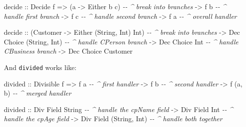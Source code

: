 \documentclass[]{article}
\newenvironment{Shaded}{}{}
\newcommand{\CommentTok}[1]{\textcolor[rgb]{0.38,0.63,0.69}{\textit{#1}}}
\newcommand{\DataTypeTok}[1]{\textcolor[rgb]{0.56,0.13,0.00}{#1}}
\newcommand{\NormalTok}[1]{#1}
\newcommand{\OtherTok}[1]{\textcolor[rgb]{0.00,0.44,0.13}{#1}}
\begin{document}
\begin{Shaded}
\begin{Highlighting}[]
\NormalTok{decide}
\OtherTok{    ::} \DataTypeTok{Decide}\NormalTok{ f}
    \OtherTok{=>}\NormalTok{ (a }\OtherTok{{-}>} \DataTypeTok{Either}\NormalTok{ b c)    }\CommentTok{{-}{-} \^{} break into branches}
    \OtherTok{{-}>}\NormalTok{ f b                  }\CommentTok{{-}{-} \^{} handle first branch}
    \OtherTok{{-}>}\NormalTok{ f c                  }\CommentTok{{-}{-} \^{} handle second branch}
    \OtherTok{{-}>}\NormalTok{ f a                  }\CommentTok{{-}{-} \^{} overall handler}

\NormalTok{decide}
\OtherTok{    ::}\NormalTok{ (}\DataTypeTok{Customer} \OtherTok{{-}>} \DataTypeTok{Either}\NormalTok{ (}\DataTypeTok{String}\NormalTok{, }\DataTypeTok{Int}\NormalTok{) }\DataTypeTok{Int}\NormalTok{)   }\CommentTok{{-}{-} \^{} break into branches}
    \OtherTok{{-}>} \DataTypeTok{Dec} \DataTypeTok{Choice}\NormalTok{ (}\DataTypeTok{String}\NormalTok{, }\DataTypeTok{Int}\NormalTok{)                 }\CommentTok{{-}{-} \^{} handle CPerson branch}
    \OtherTok{{-}>} \DataTypeTok{Dec} \DataTypeTok{Choice} \DataTypeTok{Int}                           \CommentTok{{-}{-} \^{} handle CBusiness branch}
    \OtherTok{{-}>} \DataTypeTok{Dec} \DataTypeTok{Choice} \DataTypeTok{Customer}
\end{Highlighting}
\end{Shaded}

And \texttt{divided} works like:

\begin{Shaded}
\begin{Highlighting}[]
\NormalTok{divided}
\OtherTok{    ::} \DataTypeTok{Divisible}\NormalTok{ f}
    \OtherTok{=>}\NormalTok{ f a          }\CommentTok{{-}{-} \^{} first handler}
    \OtherTok{{-}>}\NormalTok{ f b          }\CommentTok{{-}{-} \^{} second handler}
    \OtherTok{{-}>}\NormalTok{ f (a, b)     }\CommentTok{{-}{-} \^{} merged handler}

\NormalTok{divided}
\OtherTok{    ::} \DataTypeTok{Div} \DataTypeTok{Field} \DataTypeTok{String}          \CommentTok{{-}{-} \^{} handle the cpName field}
    \OtherTok{{-}>} \DataTypeTok{Div} \DataTypeTok{Field} \DataTypeTok{Int}             \CommentTok{{-}{-} \^{} handle the cpAge field}
    \OtherTok{{-}>} \DataTypeTok{Div} \DataTypeTok{Field}\NormalTok{ (}\DataTypeTok{String}\NormalTok{, }\DataTypeTok{Int}\NormalTok{)   }\CommentTok{{-}{-} \^{} handle both together}
\end{Highlighting}
\end{Shaded}
\end{document}
